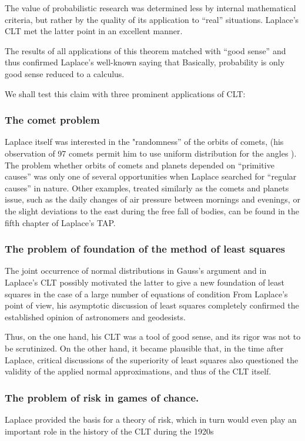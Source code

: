 \documentclass{article}
\begin{document}
The value of probabilistic research was determined less by internal mathematical criteria, but rather by the quality of its application to “real” situations. Laplace’s CLT met the latter point in an excellent manner.

The results of all applications of this theorem matched with “good sense” and thus confirmed Laplace’s well-known saying \cite{Fischer2010History} that Basically, probability is only good sense reduced to a calculus.

We shall test this claim with three prominent applications of CLT:
\subsubsection{The comet problem }
Laplace itself was interested in the "randomness” of the orbits of
comets, (his observation of 97 comets permit him to use uniform distribution for the angles ).
The problem whether orbits of comets and planets depended on “primitive causes” was only one of several opportunities when Laplace searched for “regular causes” in nature. Other examples, treated similarly as the comets and planets issue, such as the daily changes of air pressure between mornings and evenings, or
the slight deviations to the east during the free fall of bodies, can be found in the fifth chapter of Laplace’s TAP.

\subsubsection{The problem of foundation of the method of least squares}
The joint occurrence of normal distributions in Gauss’s argument and in Laplace’s CLT possibly motivated the latter to give a new foundation of least squares in the case of a large number of equations of condition From Laplace’s point of view, his asymptotic discussion of least squares completely confirmed the established opinion of astronomers and geodesists.

Thus, on the one hand, his CLT was a tool of good sense, and its rigor was not to be scrutinized. On the other hand, it became plausible that, in the time after Laplace, critical discussions of the superiority of least squares also questioned the validity of the applied normal approximations, and thus of the CLT itself.
 
\subsubsection {The problem of risk in games of chance.}
 Laplace provided the basis for a theory of risk, which in turn would even play an important role in the history of the CLT during the 1920s
\end{document}
